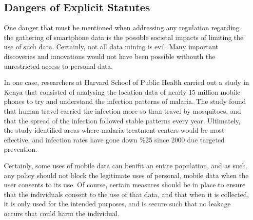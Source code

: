 	\subsection{Dangers of Explicit Statutes} 

One danger that must be mentioned when addressing any regulation regarding the gathering of smartphone data is the possible societal impacts of limiting the use of such data. Certainly, not all data mining is evil. Many important discoveries and innovations would not have been possible withouth the unrestricted access to personal data. 

In one case, researchers at Harvard School of Public Health carried out a study in Kenya that consisted of analysing the location data of nearly 15 million mobile phones to try and understand the infection patterns of malaria\cite{unlock}. The study found that human travel carried the infection more so than travel by mosquitoes, and that the spread of the infection followed stable patterns every year. Ultimately, the study identified areas where malaria treatment centers would be most effective, and infection rates have gone down \%25 since 2000 due targeted prevention. 

Certainly, some uses of mobile data can benifit an entire population, and as such, any policy should not block the legitimate uses of personal, mobile data when the user consents to its use. Of course, certain measures should be in place to ensure that the individuals consent to the use of that data, and that when it is collected, it is only used for the intended purposes, and is secure such that no leakage occurs that could harm the individual. 